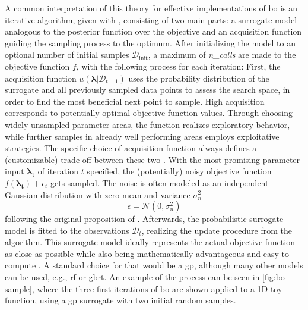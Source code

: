 A common interpretation of this theory for effective implementations of \gls{bo} is an iterative algorithm, given with , consisting of two main parts: a surrogate model analogous to the posterior function over the objective and an acquisition function guiding the sampling process to the optimum. After initializing the model to an optional number of initial samples $\mathcal{D}_\text{init}$, a maximum of \textit{n\_calls} are made to the objective function $f$, with the following process for each iteration: 
First, the acquisition function $u(\mathbf{\lambda}|\mathcal{D}_{t-1})$ uses the probability distribution of the surrogate and all previously sampled data points to assess the search space, in order to find the most beneficial next point to sample. High acquisition corresponds to potentially optimal objective function values. Through choosing widely unsampled parameter areas, the function realizes exploratory behavior, while further samples in already well performing areas employs exploitative strategies. The specific choice of acquisition function always defines a (customizable) trade-off between these two \cite{brochu2010tutorial}. 
With the most promising parameter input $\mathbf{\lambda_t}$ of iteration $t$ specified, the (potentially) noisy objective function $f(\mathbf{\lambda_t}) + \epsilon_t$ gets sampled. The noise is often modeled as an independent Gaussian distribution with zero mean and variance $\sigma_n^2$
\begin{equation}
	\label{eq:gauss-noies}
	\epsilon = \mathcal{N}(0,\sigma_n^2)
\end{equation} 
following the original proposition of \citet{williams2006gaussian}.
Afterwards, the probabilistic surrogate model is fitted to the observations $\mathcal{D}_t$, realizing the update procedure from the algorithm. This surrogate model ideally represents the actual objective function as close as possible while also being mathematically advantageous and easy to compute \cite{feurer2019hyperparameter}. A standard choice for that would be a \gls{gp}, although many other models can be used, e.g., \gls{rf} or \gls{gbrt}.
An example of the process can be seen in \cref{fig:bo-sample}, where the three first iterations of \gls{bo}  are shown applied to a 1D toy function, using a \gls{gp} surrogate with two initial random samples.

